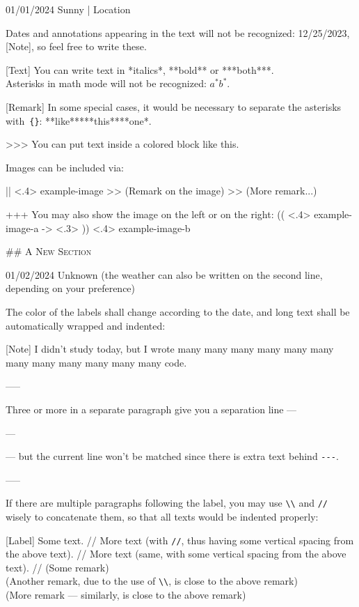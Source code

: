 \documentclass[11pt, paperstyle=light yellow, color entry, month-day-year,
  title in boldface, title in sffamily, use style = classical]{jwjournal}
\begin{document}
01/01/2024 Sunny | Location

  Dates and annotations appearing in the text will not be recognized: 12/25/2023, [Note], so feel free to write these.

  [Text]
    You can write text in *italics*, **bold** or ***both***.
    \\
    Asterisks in math mode will not be recognized: $a^* b^*$.

  [Remark] In some special cases, it would be necessary to separate the asterisks with~\texttt{\{\}}: **like**{}***this***{}*one*.

  >>> You can put text inside a colored block like this.

  Images can be included via:

  || <.4> {example-image} %
  >> (Remark on the image)
  >> (More remark...)

  +++
  You may also show the image on the left or on the right:
  (( <.4> {example-image-a} %
  -> <.3> %
  )) <.4> {example-image-b} %


## {\textsc{A New Section}}

01/02/2024
Unknown (the weather can also be written on the second line, depending on your preference)

  The color of the labels shall change according to the date, and long text shall be automatically wrapped and indented:

  [Note] I didn't study today, but I wrote many many many many many many many many many many many many code.

  -----

  Three or more \textquote{\texttt{-}} in a separate paragraph give you a separation line ---

  ---

  --- but the current line won't be matched since there is extra text behind \texttt{-}\texttt{-}\texttt{-}.

  -----

  If there are multiple paragraphs following the label, you may use \texttt{\textbackslash\textbackslash} and \texttt{\slash\slash} wisely to concatenate them, so that all texts would be indented properly:

  [Label] Some text.
    //
    More text (with \texttt{\slash\slash}, thus having some vertical spacing from the above text).
    //
    More text (same, with some vertical spacing from the above text).
    //
    (Some remark)
    \\
    (Another remark, due to the use of \texttt{\textbackslash\textbackslash}, is close to the above remark)
    \\
    (More remark --- similarly, is close to the above remark)
\end{document}
